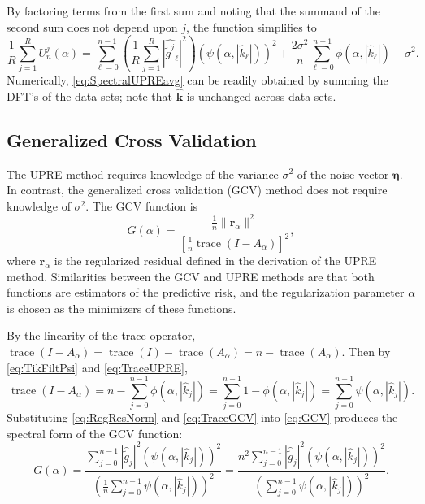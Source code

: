 \documentclass[12pt]{article}
\newcommand{\gnoise}{\widetilde{g}}	%
\newcommand{\kVec}{\mathbf{k}}	%
\DeclareMathOperator{\trace}{trace}		%
\newcommand{\regparam}{\alpha}
\newcommand{\filt}{\phi}
\newcommand{\mfilt}{\psi}
\newcommand{\noise}{\eta}	%
\newcommand{\noiseSD}{\sigma}	%
\newcommand{\noiseVec}{\bm{\noise}}	%
\newcommand{\regres}{\mathbf{r}_{\regparam}}	%
\newcommand{\A}{A_{\regparam}}	%
\newcommand{\U}{U}	%
\newcommand{\GCV}{G}	%
\begin{document}
By factoring terms from the first sum and noting that the summand of the second sum does not depend upon $j$, the function simplifies to
\begin{equation}
\frac{1}{R}\sum_{j=1}^R \U_n^j(\regparam) =  \sum_{\ell = 0}^{n-1} \left(\frac{1}{R}\sum_{j=1}^R |\widehat{\gnoise^j}_\ell|^2\right)(\mfilt(\regparam,|\widehat{k}_\ell|))^2 + \frac{2\noiseSD^2}{n}\sum_{\ell = 0}^{n-1} \filt(\regparam,|\widehat{k}_\ell|) - \noiseSD^2.
\label{eq:SpectralUPREavg}
\end{equation}
Numerically, \eqref{eq:SpectralUPREavg} can be readily obtained by summing the DFT's of the data sets; note that $\widehat{\kVec}$ is unchanged across data sets.

\subsection{Generalized Cross Validation} \label{sec:Generalized Cross Validation}
The UPRE method requires knowledge of the variance $\noiseSD^2$ of the noise vector $\noiseVec$. In contrast, the generalized cross validation (GCV) method does not require knowledge of $\noiseSD^2$. The GCV function is
\begin{equation}
\label{eq:GCV}
\GCV(\regparam) = \frac{\frac{1}{n}\|\regres\|^2}{\left[\frac{1}{n}\trace(I-\A)\right]^2},
\end{equation}
where $\regres$ is the regularized residual defined in the derivation of the UPRE method. Similarities between the GCV and UPRE methods are that both functions are estimators of the predictive risk, and the regularization parameter $\regparam$ is chosen as the minimizers of these functions. \par 
By the linearity of the trace operator, $\trace(I-\A) = \trace(I)-\trace(\A) = n - \trace(\A)$. Then by \eqref{eq:TikFiltPsi} and \eqref{eq:TraceUPRE},
\begin{equation}
\trace(I-\A) = n - \sum_{j = 0}^{n-1} \filt(\regparam,|\widehat{k}_j|) = \sum_{j = 0}^{n-1} 1 - \filt(\regparam,|\widehat{k}_j|) = \sum_{j = 0}^{n-1} \mfilt(\regparam,|\widehat{k}_j|).
\label{eq:TraceGCV}
\end{equation}
Substituting \eqref{eq:RegResNorm} and \eqref{eq:TraceGCV} into \eqref{eq:GCV} produces the spectral form of the GCV function:
\begin{equation}
\GCV(\regparam) = \frac{\sum_{j = 0}^{n-1} |\widehat{\gnoise}_j|^2(\mfilt(\regparam,|\widehat{k}_j|))^2}{(\frac{1}{n}\sum_{j = 0}^{n-1} \mfilt(\regparam,|\widehat{k}_j|))^2} = \frac{n^2\sum_{j = 0}^{n-1} |\widehat{\gnoise}_j|^2(\mfilt(\regparam,|\widehat{k}_j|))^2}{(\sum_{j = 0}^{n-1} \mfilt(\regparam,|\widehat{k}_j|))^2}.
\label{eq:SpectralGCV}
\end{equation} \par 
\end{document}
